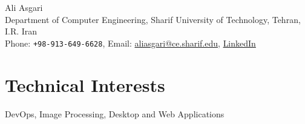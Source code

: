 \documentclass[10pt, a4paper]{article}
\begin{document}
{\LARGE Ali Asgari}\\[1cm]
Department of Computer Engineering, Sharif University of Technology, Tehran, I.R. Iran\\[.2cm]
Phone: \texttt{+98-913-649-6628}, Email: \href{mailto:aliasgari@ce.sharif.edu}{aliasgari@ce.sharif.edu},  \href{https://www.linkedin.com/in/ali-asgari-51981884/}{LinkedIn}\\ 


\section*{Technical Interests}
DevOps, Image Processing, Desktop and Web Applications
\end{document}
